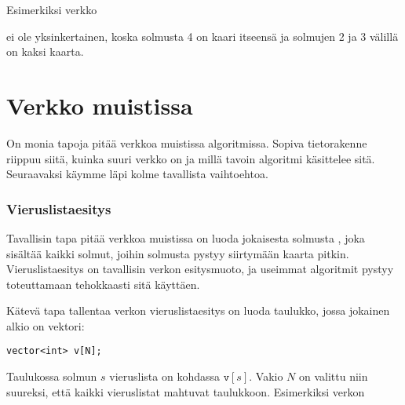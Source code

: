 Esimerkiksi verkko
\begin{center}
\end{center}
ei ole yksinkertainen, koska solmusta 4 on kaari itseensä
ja solmujen 2 ja 3 välillä on kaksi kaarta.

\section{Verkko muistissa}

On monia tapoja pitää verkkoa muistissa algoritmissa.
Sopiva tietorakenne riippuu siitä,
kuinka suuri verkko on ja
millä tavoin algoritmi käsittelee sitä.
Seuraavaksi käymme läpi kolme tavallista vaihtoehtoa.

\subsubsection{Vieruslistaesitys}


Tavallisin tapa pitää verkkoa muistissa on
luoda jokaisesta solmusta ,
joka sisältää kaikki solmut,
joihin solmusta pystyy siirtymään kaarta pitkin.
Vieruslistaesitys on tavallisin verkon esitysmuoto, ja
useimmat algoritmit pystyy toteuttamaan
tehokkaasti sitä käyttäen.

Kätevä tapa tallentaa verkon vieruslistaesitys on luoda taulukko,
jossa jokainen alkio on vektori:
\begin{lstlisting}
vector<int> v[N];
\end{lstlisting}

Taulukossa solmun $s$ vieruslista on kohdassa $\texttt{v}[s]$.
Vakio $N$ on valittu niin suureksi,
että kaikki vieruslistat mahtuvat taulukkoon.
Esimerkiksi verkon

